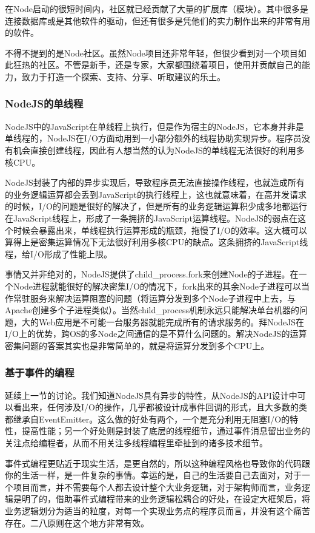 在Node启动的很短时间内，社区就已经贡献了大量的扩展库（模块）。其中很多是连接数据库或是其他软件的驱动，但还有很多是凭他们的实力制作出来的非常有用的软件。

不得不提到的是Node社区。虽然Node项目还非常年轻，但很少看到对一个项目如此狂热的社区。不管是新手，还是专家，大家都围绕着项目，使用并贡献自己的能力，致力于打造一个探索、支持、分享、听取建议的乐土。

\subsubsection{NodeJS的单线程}
\indent
NodeJS中的JavaScript在单线程上执行，但是作为宿主的NodeJS，它本身并非是单线程的，NodeJS在I/O方面动用到一小部分额外的线程协助实现异步。程序员没有机会直接创建线程，因此有人想当然的认为NodeJS的单线程无法很好的利用多核CPU。

\indent
NodeJS封装了内部的异步实现后，导致程序员无法直接操作线程，也就造成所有的业务逻辑运算都会丢到JavaScript的执行线程上，这也就意味着，在高并发请求的时候，I/O的问题是很好的解决了，但是所有的业务逻辑运算积少成多地都运行在JavaScript线程上，形成了一条拥挤的JavaScript运算线程。NodeJS的弱点在这个时候会暴露出来，单线程执行运算形成的瓶颈，拖慢了I/O的效率。这大概可以算得上是密集运算情况下无法很好利用多核CPU的缺点。这条拥挤的JavaScript线程，给I/O形成了性能上限。

\indent
事情又并非绝对的，NodeJS提供了child\_process.fork来创建Node的子进程。在一个Node进程就能很好的解决密集I/O的情况下，fork出来的其余Node子进程可以当作常驻服务来解决运算阻塞的问题（将运算分发到多个Node子进程中上去，与Apache创建多个子进程类似）。当然child\_process机制永远只能解决单台机器的问题，大的Web应用是不可能一台服务器就能完成所有的请求服务的。拜NodeJS在I/O上的优势，跨OS的多Node之间通信的是不算什么问题的。解决NodeJS的运算密集问题的答案其实也是非常简单的，就是将运算分发到多个CPU上。

\subsubsection{基于事件的编程}
\indent
延续上一节的讨论。我们知道NodeJS具有异步的特性，从NodeJS的API设计中可以看出来，任何涉及I/O的操作，几乎都被设计成事件回调的形式，且大多数的类都继承自EventEmitter。这么做的好处有两个，一个是充分利用无阻塞I/O的特性，提高性能；另一个好处则是封装了底层的线程细节，通过事件消息留出业务的关注点给编程者，从而不用关注多线程编程里牵扯到的诸多技术细节。

\indent
事件式编程更贴近于现实生活，是更自然的，所以这种编程风格也导致你的代码跟你的生活一样，是一件复杂的事情。幸运的是，自己的生活要自己去面对，对于一个项目而言，并不需要每个人都去设计整个大业务逻辑，对于架构师而言，业务逻辑是明了的，借助事件式编程带来的业务逻辑松耦合的好处，在设定大框架后，将业务逻辑划分为适当的粒度，对每一个实现业务点的程序员而言，并没有这个痛苦存在。二八原则在这个地方非常有效。


